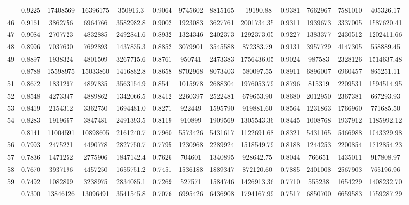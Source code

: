 \documentclass[
  12pt,
]{article}
\begin{document}
\begin{longtable}[t]{lcccccccccccc}
\addlinespace
45 & 0.9225 & 17408569 & 16396175 & 350916.3 & 0.9064 & 9745602 & 8815165 & -19190.88 & 0.9381 & 7662967 & 7581010 & 405326.17\\
46 & 0.9161 & 3862756 & 6964766 & 3582982.8 & 0.9002 & 1923083 & 3627761 & 2001734.35 & 0.9311 & 1939673 & 3337005 & 1587620.41\\
47 & 0.9084 & 2707723 & 4832885 & 2492841.6 & 0.8932 & 1324346 & 2402373 & 1292373.05 & 0.9227 & 1383377 & 2430512 & 1202411.66\\
48 & 0.8996 & 7037630 & 7692893 & 1437835.3 & 0.8852 & 3079901 & 3545588 & 872383.79 & 0.9131 & 3957729 & 4147305 & 558889.45\\
49 & 0.8897 & 1938324 & 4801509 & 3267715.6 & 0.8761 & 950741 & 2473383 & 1756436.05 & 0.9024 & 987583 & 2328126 & 1514637.48\\
\addlinespace
50 & 0.8788 & 15598975 & 15033860 & 1416882.8 & 0.8658 & 8702968 & 8073403 & 580097.55 & 0.8911 & 6896007 & 6960457 & 865251.11\\
51 & 0.8672 & 1831297 & 4897835 & 3563154.9 & 0.8541 & 1015978 & 2688304 & 1976053.79 & 0.8796 & 815319 & 2209531 & 1594514.95\\
52 & 0.8548 & 4273347 & 4889862 & 1342066.5 & 0.8412 & 2260397 & 2522481 & 679653.90 & 0.8680 & 2012950 & 2367381 & 667293.93\\
53 & 0.8419 & 2154312 & 3362750 & 1694481.0 & 0.8271 & 922449 & 1595790 & 919881.60 & 0.8564 & 1231863 & 1766960 & 771685.50\\
54 & 0.8283 & 1919667 & 3847481 & 2491393.5 & 0.8119 & 910899 & 1909569 & 1305543.36 & 0.8445 & 1008768 & 1937912 & 1185992.12\\
\addlinespace
55 & 0.8141 & 11004591 & 10898605 & 2161240.7 & 0.7960 & 5573426 & 5431617 & 1122691.68 & 0.8321 & 5431165 & 5466988 & 1043329.98\\
56 & 0.7993 & 2475221 & 4490778 & 2827750.7 & 0.7795 & 1230968 & 2289924 & 1518549.79 & 0.8188 & 1244253 & 2200854 & 1312854.23\\
57 & 0.7836 & 1471252 & 2775906 & 1847142.4 & 0.7626 & 704601 & 1340895 & 928642.75 & 0.8044 & 766651 & 1435011 & 917808.97\\
58 & 0.7670 & 3937196 & 4457250 & 1655751.2 & 0.7451 & 1536188 & 1889347 & 872120.60 & 0.7885 & 2401008 & 2567903 & 765196.96\\
59 & 0.7492 & 1082809 & 3238975 & 2834085.1 & 0.7269 & 527571 & 1584746 & 1426913.36 & 0.7710 & 555238 & 1654229 & 1408232.70\\
\addlinespace
60 & 0.7300 & 13846126 & 13096491 & 3541545.8 & 0.7076 & 6995426 & 6436908 & 1794167.99 & 0.7517 & 6850700 & 6659583 & 1759287.29\\

\end{longtable}
\end{document}
